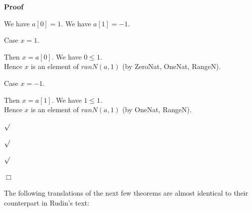 \documentclass{article}
\newenvironment{forthel}{\begin{leftbar}}{\end{leftbar}}
\newenvironment{proof}{\noindent\textbf{Proof\ }}{\hspace*{\fill}$\Box$\medskip}
\newenvironment{subproof}{\begin{list}{}{}
		\item[\text{Proof}]}{\hfill $\surd$ \end{list}}
\newenvironment{case}{\begin{list}{}{}
		\item[]}{\end{list}}
\begin{document}
\begin{forthel}
\begin{proof}
\begin{subproof}
\begin{subproof}
\begin{subproof}
					We have $a[0] = 1$.
					We have $a[1] = -1$.
					
					Case $x = 1$.
					\begin{case}
						Then $x = a[0]$.
						We have $0 \leq 1$.\\
						Hence $x$ is an element of $ranN(a,1)$ (by ZeroNat, OneNat, RangeN).
					\end{case}
					Case $x = -1$.
					\begin{case}
						Then $x = a[1]$. 
						We have $1 \leq 1$.\\
						Hence $x$ is an element of $ranN(a,1)$ (by OneNat, RangeN).
					\end{case}
				\end{subproof}
			\end{subproof}
		\end{subproof}
	\end{proof}
\end{forthel}

\noindent The following translations of the next few theorems are almost identical to their counterpart in Rudin's text:
\end{document}
